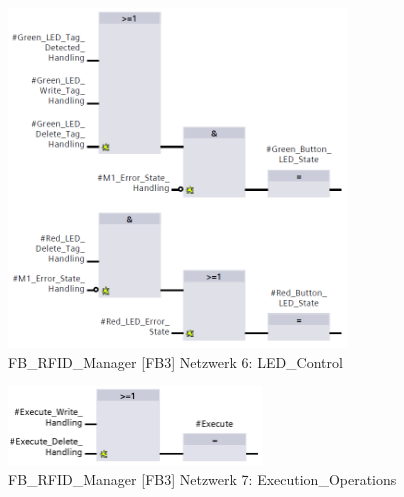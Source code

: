 \begin{figure}[h!]
	\centering
	\includegraphics[width=0.8\textwidth]{images/FBRFIDManagerNetzwerk6.png}
	\caption{FB\_RFID\_Manager [FB3] Netzwerk 6: LED\_Control}
	\label{fig:FBRFIDManager[FB3]Netzwerk6}
\end{figure}
\begin{figure}[h!]
	\centering
	\includegraphics[width=0.6\textwidth]{images/FBRFIDManagerNetzwerk7.png}
	\caption{FB\_RFID\_Manager [FB3] Netzwerk 7: Execution\_Operations}
	\label{fig:FBRFIDManager[FB3]Netzwerk7}
\end{figure}

